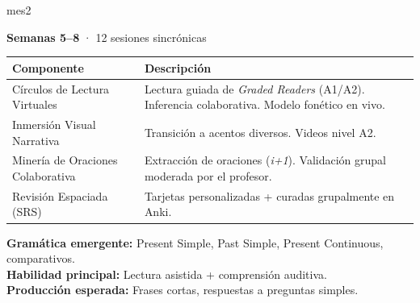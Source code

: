 \documentclass[12pt,a4paper]{article}
\begin{document}
\begin{cajames}[\textcolor{white}{Mes 2: Minería Colaborativa y Lectura Asistida (A1 $\rightarrow$ A2)}]{mes2}

\textbf{Semanas 5--8} · 12 sesiones sincrónicas

\medskip
\begin{tabularx}{\textwidth}{@{} l X @{}}
\toprule
\textbf{Componente} & \textbf{Descripción} \\
\midrule
Círculos de Lectura Virtuales & Lectura guiada de \textit{Graded Readers} (A1/A2). Inferencia colaborativa. Modelo fonético en vivo. \\[4pt]
Inmersión Visual Narrativa & Transición a acentos diversos. Videos nivel A2. \\[4pt]
Minería de Oraciones Colaborativa & Extracción de oraciones (\textit{i+1}). Validación grupal moderada por el profesor. \\[4pt]
Revisión Espaciada (SRS) & Tarjetas personalizadas + curadas grupalmente en Anki. \\
\bottomrule
\end{tabularx}

\medskip
\textbf{Gramática emergente:} Present Simple, Past Simple, Present Continuous, comparativos.\\
\textbf{Habilidad principal:} Lectura asistida + comprensión auditiva.\\
\textbf{Producción esperada:} Frases cortas, respuestas a preguntas simples.
\end{cajames}

\vspace{0.3cm}
\end{document}
